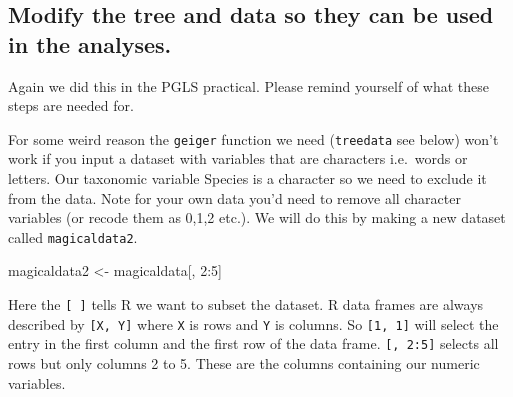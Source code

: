 \documentclass[]{book}
\newenvironment{Shaded}{\begin{snugshade}}{\end{snugshade}}
\newcommand{\KeywordTok}[1]{\textcolor[rgb]{0.13,0.29,0.53}{\textbf{{#1}}}}
\newcommand{\DecValTok}[1]{\textcolor[rgb]{0.00,0.00,0.81}{{#1}}}
\newcommand{\StringTok}[1]{\textcolor[rgb]{0.31,0.60,0.02}{{#1}}}
\newcommand{\CommentTok}[1]{\textcolor[rgb]{0.56,0.35,0.01}{\textit{{#1}}}}
\newcommand{\NormalTok}[1]{{#1}}
\begin{document}
\subsection{Modify the tree and data so they can be used in the
analyses.}\label{modify-the-tree-and-data-so-they-can-be-used-in-the-analyses.-1}

Again we did this in the PGLS practical. Please remind yourself of what
these steps are needed for.

\begin{Shaded}
\end{Shaded}

For some weird reason the \texttt{geiger} function we need
(\texttt{treedata} see below) won't work if you input a dataset with
variables that are characters i.e.~words or letters. Our taxonomic
variable Species is a character so we need to exclude it from the data.
Note for your own data you'd need to remove all character variables (or
recode them as 0,1,2 etc.). We will do this by making a new dataset
called \texttt{magicaldata2}.

\begin{Shaded}
\begin{Highlighting}[]
\NormalTok{magicaldata2 <-}\StringTok{ }\NormalTok{magicaldata[, }\DecValTok{2}\NormalTok{:}\DecValTok{5}\NormalTok{]}
\end{Highlighting}
\end{Shaded}

Here the \texttt{{[}\ {]}} tells R we want to subset the dataset. R data
frames are always described by \texttt{{[}X,\ Y{]}} where \texttt{X} is
rows and \texttt{Y} is columns. So \texttt{{[}1,\ 1{]}} will select the
entry in the first column and the first row of the data frame.
\texttt{{[},\ 2:5{]}} selects all rows but only columns 2 to 5. These
are the columns containing our numeric variables.
\end{document}
